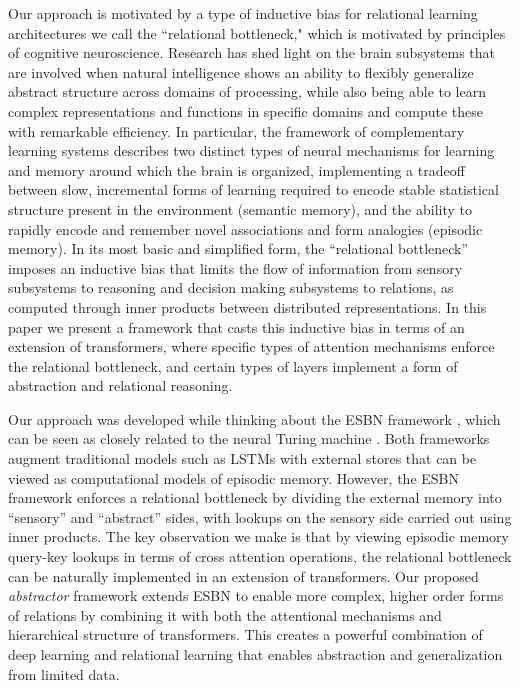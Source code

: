 Our approach is motivated by a type of inductive bias for relational learning architectures we call the ``relational bottleneck," which is motivated by principles of cognitive neuroscience. Research has shed light on the brain subsystems that are involved when natural intelligence shows an ability to flexibly generalize abstract structure across domains of processing, while also being able to learn complex representations and functions in specific domains and compute these with remarkable efficiency.  In particular, the framework of 
complementary learning systems \citep{McClelland:1995, Kumaran:2016} describes two distinct types of neural mechanisms for learning and memory around which the brain is organized, implementing a tradeoff between slow, incremental forms of learning required to encode stable statistical structure present in the environment (semantic memory), and the ability to rapidly encode and remember novel associations and form analogies (episodic memory). In its most basic and simplified form, the ``relational bottleneck'' imposes an inductive bias that limits the flow of information from sensory subsystems to reasoning and decision making subsystems to relations, as computed through inner products between distributed representations. In this paper we present a framework that casts this inductive bias in terms of 
an extension of transformers, where specific types of attention mechanisms enforce the relational bottleneck, 
and certain types of layers implement a form of abstraction and relational reasoning.

Our approach was developed while thinking about the ESBN framework \citep{esbn}, which can be seen as 
closely related to the neural Turing machine \citep{NTM}. Both frameworks augment traditional models such as 
LSTMs with external stores that can be viewed as computational models of episodic memory. However, the ESBN framework enforces a relational bottleneck by dividing the external memory into ``sensory'' and ``abstract'' sides, with lookups on the sensory side carried out using inner products. The key observation we make is that by viewing episodic  
memory query-key lookups in terms of cross attention operations, the relational bottleneck can be 
naturally implemented in an extension of transformers. Our proposed \textit{abstractor} framework extends ESBN to enable more complex, higher order forms of relations by combining it with both the attentional mechanisms and hierarchical structure of transformers. This creates a powerful combination of deep learning and relational learning that enables abstraction and generalization from limited data.




